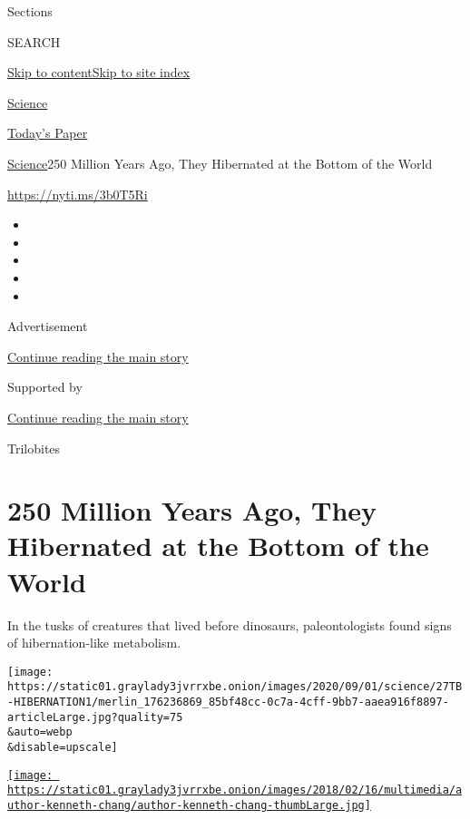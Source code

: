 Sections

SEARCH

\protect\hyperlink{site-content}{Skip to
content}\protect\hyperlink{site-index}{Skip to site index}

\href{https://www.nytimes3xbfgragh.onion/section/science}{Science}

\href{https://myaccount.nytimes3xbfgragh.onion/auth/login?response_type=cookie\&client_id=vi}{}

\href{https://www.nytimes3xbfgragh.onion/section/todayspaper}{Today's
Paper}

\href{/section/science}{Science}\textbar{}250 Million Years Ago, They
Hibernated at the Bottom of the World

\url{https://nyti.ms/3b0T5Ri}

\begin{itemize}
\item
\item
\item
\item
\item
\end{itemize}

Advertisement

\protect\hyperlink{after-top}{Continue reading the main story}

Supported by

\protect\hyperlink{after-sponsor}{Continue reading the main story}

Trilobites

\hypertarget{250-million-years-ago-they-hibernated-at-the-bottom-of-the-world}{%
\section{250 Million Years Ago, They Hibernated at the Bottom of the
World}\label{250-million-years-ago-they-hibernated-at-the-bottom-of-the-world}}

In the tusks of creatures that lived before dinosaurs, paleontologists
found signs of hibernation-like metabolism.

\texttt{[image: https://static01.graylady3jvrrxbe.onion/images/2020/09/01/science/27TB-HIBERNATION1/merlin\_176236869\_85bf48cc-0c7a-4cff-9bb7-aaea916f8897-articleLarge.jpg?quality=75\\\&auto=webp\\\&disable=upscale]}

\href{https://www.nytimes3xbfgragh.onion/by/kenneth-chang}{\texttt{[image: https://static01.graylady3jvrrxbe.onion/images/2018/02/16/multimedia/author-kenneth-chang/author-kenneth-chang-thumbLarge.jpg]}}

